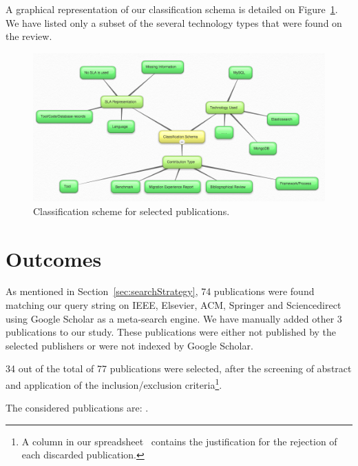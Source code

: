 \documentclass{article}
\begin{document}
A graphical representation of our classification schema is detailed on Figure~\ref{fig:classificationSchema}. We have listed only a subset of the several technology types that were found on the review.

\begin{figure}[!h]
\centering
\includegraphics[width=130mm]{classificationSchema.png}
\caption{Classification scheme for selected publications. \label{fig:classificationSchema}}
\end{figure}

\section{Outcomes}
\label{sec:outcomes}

As mentioned in Section~\ref{sec:searchStrategy}, 74 publications were found matching our query string on IEEE, Elsevier, ACM, Springer and Sciencedirect using Google Scholar as a meta-search engine. We have manually added other 3 publications to our study. These publications were either not published by the selected publishers or were not indexed by Google Scholar. 

34 out of the total of 77 publications were selected, after the screening of abstract and application of the inclusion/exclusion criteria\footnote{A column in our spreadsheet~\cite{systematicMappingSpreadsheet} contains the justification for the rejection of each discarded publication.}.

The considered publications are: \cite{6665220} \cite{6253526}  \cite{6461875} \cite{6597164} \cite{6616442} \cite{Xiong:2012:DMR:2213598.2213614} \cite{Alomari:2014:CFD:2684200.2684324} \cite{6632740} \cite{6253597} \cite{cloudhosteddatabases} \cite{6655733} \cite{192837618237651293} \cite{6616442} \cite{designinganddevelopment} \cite{5959767} \cite{Petcu20131417} \cite{Giannikis:2013:WOU:2463676.2463678} \cite{1236781237} \cite{6280329} \cite{6681233} \cite{Xiong:2011:APA:2038916.2038931} \cite{7037676} \cite{7017947} \cite{Qiao:2013:BFE:2463676.2465298} \cite{5742778} \cite{Montes20132026} \cite{Elmore:2013:CTB:2463676.2465308} \cite{12789361729836} \cite{6842585} \cite{Shue:2014:ARV:2592798.2592823} \cite{Schram:2012:MND:2384716.2384773} \cite{buazuartransition} \cite{gomez2014building} \cite{6546068}.
\end{document}
